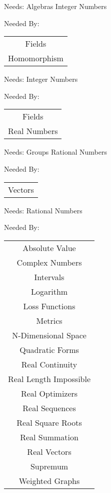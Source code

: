 \newpage
\label{groups}


\clearpage
Needs:  Algebras  Integer Numbers 

Needed By: \begin{tabular}{c} Fields \\  Homomorphism \\ 
\end{tabular}
\clearpage{}

\newpage
\label{rational_numbers}


\clearpage
Needs:  Integer Numbers 

Needed By: \begin{tabular}{c} Fields \\  Real Numbers \\ 
\end{tabular}
\clearpage{}

\newpage
\label{fields}


\clearpage
Needs:  Groups  Rational Numbers 

Needed By: \begin{tabular}{c} Vectors \\ 
\end{tabular}
\clearpage{}

\newpage
\label{real_numbers}


\clearpage
Needs:  Rational Numbers 

Needed By: \begin{tabular}{c} Absolute Value \\  Complex Numbers \\  Intervals \\  Logarithm \\  Loss Functions \\  Metrics \\  N-Dimensional Space \\  Quadratic Forms \\  Real Continuity \\  Real Length Impossible \\  Real Optimizers \\  Real Sequences \\  Real Square Roots \\  Real Summation \\  Real Vectors \\  Supremum \\  Weighted Graphs \\ 
\end{tabular}
\clearpage{}

